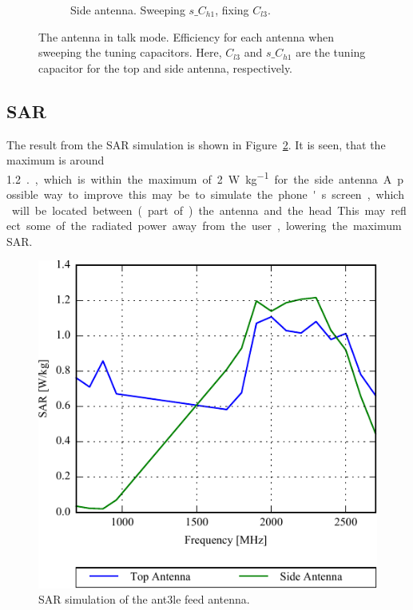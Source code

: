 \begin{figure}[htbp]
\begin{subfigure}{0.49\linewidth}
        \caption{Side antenna. Sweeping $s\_C_{h1}$, fixing $C_{l3}$.}
    \end{subfigure}
    \caption{The antenna in talk mode. Efficiency for each antenna when sweeping the tuning capacitors. Here, $C_{l3}$ and $s\_C_{h1}$ are the tuning capacitor for the top and side antenna, respectively.}
    \label{fig:eff_sol3talk}
\end{figure}


\FloatBarrier
\subsection{SAR}

The result from the SAR simulation is shown in Figure~\ref{fig:ant3_sar_sim}. It is seen, that the maximum is around \SI{1.2}{.}, which is within the maximum of \SI{2}{W\per kg} for the side antenna. A possible way to improve this may be to simulate the phone's screen, which will be located between (part of) the antenna and the head. This may reflect some of the radiated power away from the user, lowering the maximum SAR.

\begin{figure}[htbp]
    \centering
    \includegraphics{img/tech_sol/nonresonant/simulation/sar/Sar_top_side.pdf}
    \caption{SAR simulation of the ant3le feed antenna.}
    \label{fig:ant3_sar_sim}
\end{figure}




